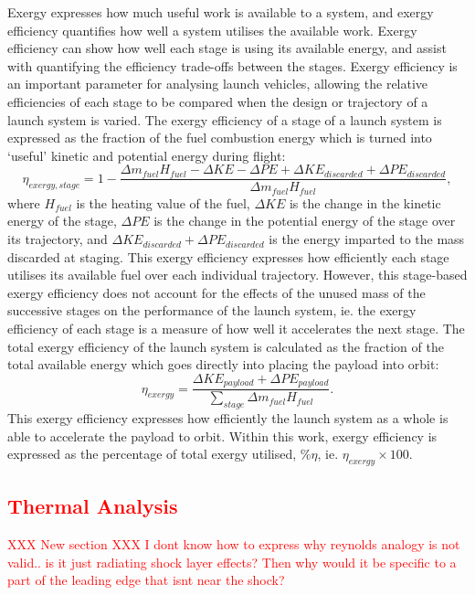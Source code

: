Exergy expresses how much useful work is available to a system, and exergy efficiency quantifies how well a system utilises the available work. 
 Exergy efficiency can show how well each stage is using its available energy, and assist with quantifying the efficiency trade-offs between the stages.
 Exergy efficiency is an important parameter for analysing launch vehicles, allowing the relative efficiencies of each stage to be compared when the design or trajectory of a launch system is varied\cite{Gilbert2015}. The exergy efficiency of a stage of a launch system is expressed as the fraction of the fuel combustion energy which is turned into `useful' kinetic and potential energy during flight:
\begin{equation}
\eta_{exergy,stage} = 1 - \frac{\Delta m_{fuel}H_{fuel} - \Delta KE -\Delta PE + \Delta KE_{discarded} + \Delta PE_{discarded}}{\Delta m_{fuel}H_{fuel}},
\end{equation}
where $H_{fuel}$ is the heating value of the fuel, $\Delta KE$ is the change in the kinetic energy of the stage, $\Delta PE$ is the change in the potential energy of the stage over its trajectory, and $\Delta KE_{discarded} + \Delta PE_{discarded}$ is the energy imparted to the mass discarded at staging.
This exergy efficiency expresses how efficiently each stage utilises its available fuel over each individual trajectory. However, this stage-based exergy efficiency does not account for the effects of the unused mass of the successive stages on the performance of the launch system, ie. the exergy efficiency of each stage is a measure of how well it accelerates the next stage. The total exergy efficiency of the launch system is calculated as the fraction of the total available energy which goes directly into placing the payload into orbit:
\begin{equation}
\eta_{exergy} = \frac{\Delta KE_{payload} + \Delta PE_{payload}}{\sum_{stage} \Delta m_{fuel}H_{fuel}}.
\end{equation}
This exergy efficiency expresses how efficiently the launch system as a whole is able to accelerate the payload to orbit. 
Within this work, exergy efficiency is expressed as the percentage of total exergy utilised, \%$\eta$, ie. $\eta_{exergy} \times 100$.

\textcolor{red}{
\section{Thermal Analysis}
}
\textcolor{red}{XXX New section}
\textcolor{red}{XXX I dont know how to express why reynolds analogy is not valid.. is it just radiating shock layer effects? Then why would it be specific to a part of the leading edge that isnt near the shock?}

